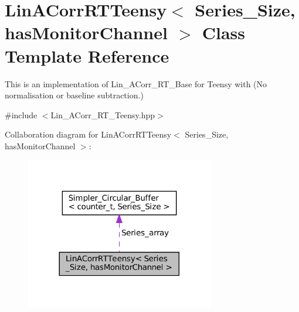 \hypertarget{classLinACorrRTTeensy}{}\section{Lin\+A\+Corr\+R\+T\+Teensy$<$ Series\+\_\+\+Size, has\+Monitor\+Channel $>$ Class Template Reference}
\label{classLinACorrRTTeensy}


This is an implementation of Lin\+\_\+\+A\+Corr\+\_\+\+R\+T\+\_\+\+Base for Teensy with {\bfseries }(No normalisation or baseline subtraction.)  




{\ttfamily \#include $<$Lin\+\_\+\+A\+Corr\+\_\+\+R\+T\+\_\+\+Teensy.\+hpp$>$}



Collaboration diagram for Lin\+A\+Corr\+R\+T\+Teensy$<$ Series\+\_\+\+Size, has\+Monitor\+Channel $>$\+:
\nopagebreak
\begin{figure}[H]
\begin{center}
\leavevmode
\includegraphics[width=233pt]{classLinACorrRTTeensy__coll__graph}
\end{center}
\end{figure}
